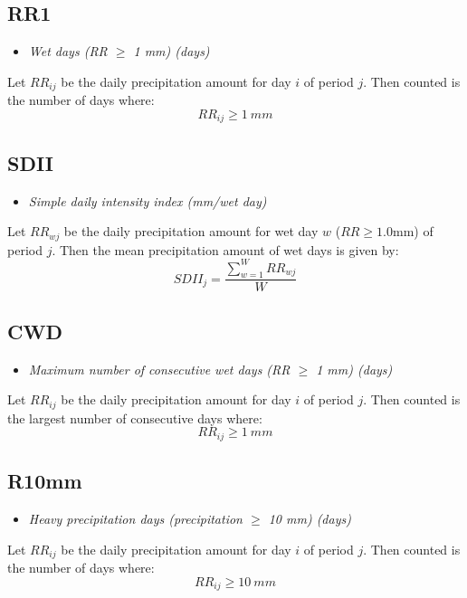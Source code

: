 \documentclass[a4paper,11pt]{article}
\begin{document}
\subsection*{RR1}
\begin{itemize}
\item \textit{Wet days (RR $\geq$ 1 mm) (days)}
\end{itemize}
Let $RR_{ij}$ be the daily precipitation amount for day $i$ of period
$j$. Then counted is the number of days where:
\begin{equation*}
RR_{ij} \geq 1~mm
\end{equation*}

\subsection*{SDII}
\begin{itemize}
\item \textit{Simple daily intensity index (mm/wet day)}
\end{itemize}
Let $RR_{wj}$ be the daily precipitation amount for wet day $w$
($RR\geq1.0$mm) of period $j$. Then the mean precipitation amount of
wet days is given by:
\begin{equation*}
SDII_j =\frac{\sum_{w=1}^{W} RR_{wj}}{W}
\end{equation*}


\subsection*{CWD}
\begin{itemize}
\item \textit{Maximum number of consecutive wet days (RR $\geq$ 1 mm) (days)}
\end{itemize}
Let $RR_{ij}$ be the daily precipitation amount for day $i$ of period
$j$. Then counted is the largest number of consecutive days where:
\begin{equation*}
RR_{ij} \geq 1~mm
\end{equation*}

\subsection*{R10mm}
\begin{itemize}
\item \textit{Heavy precipitation days (precipitation $\geq$ 10 mm) (days)}
\end{itemize}
Let $RR_{ij}$ be the daily precipitation amount for day $i$ of period
$j$. Then counted is the number of days where:
\begin{equation*}
RR_{ij} \geq 10~mm
\end{equation*}
\end{document}
